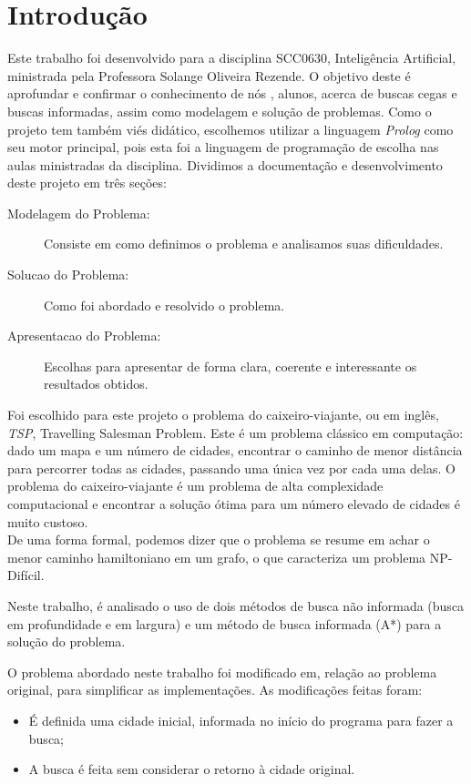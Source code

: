 \documentclass[12pt,a4paper]{article}
\begin{document}
\section{Introdução}
Este trabalho foi desenvolvido para a disciplina SCC0630, Inteligência Artificial, ministrada pela Professora Solange Oliveira Rezende. O objetivo deste é aprofundar e confirmar o conhecimento de nós , alunos, acerca de buscas cegas e buscas informadas, assim como modelagem e solução de problemas. Como o projeto tem também viés didático, escolhemos utilizar a linguagem \emph{Prolog} como seu motor principal, pois esta foi a linguagem de programação de escolha nas aulas ministradas da disciplina. Dividimos a documentação e desenvolvimento deste projeto em três seções:
\begin{description}
  \item [Modelagem do Problema:]

Consiste em como definimos o problema e analisamos suas dificuldades.
\item [Solucao do Problema:]

Como  foi abordado e resolvido o problema.
\item[Apresentacao do Problema:]

Escolhas para apresentar de forma clara, coerente e interessante os resultados obtidos.  
\end{description}

Foi escolhido para este projeto o problema do caixeiro-viajante, ou em inglês, \emph{TSP}, Travelling Salesman Problem.
Este é um problema clássico em computação: dado um mapa e um número de cidades, encontrar o caminho de menor distância para percorrer todas as cidades,
passando uma única vez por cada uma delas. O problema do caixeiro-viajante é um problema de alta complexidade computacional e encontrar a solução ótima para um número elevado de cidades é muito custoso.\\
De uma forma formal, podemos dizer que o problema se resume em achar o menor caminho hamiltoniano em um grafo, o que caracteriza um problema NP-Difícil.

Neste trabalho, é analisado o uso de dois métodos de busca não informada (busca em profundidade e em largura) e um método de busca informada (A*) para a solução do problema.

O problema abordado neste trabalho foi modificado em, relação ao problema original, para simplificar as implementações. As modificações feitas foram:
\begin{itemize}
  \item 

É definida uma cidade inicial, informada no início do programa para fazer a busca;
\item A busca é feita sem considerar o retorno à cidade original.
\end{itemize}
\end{document}
